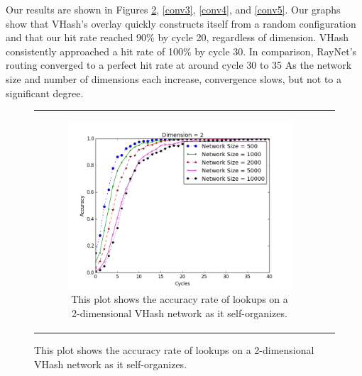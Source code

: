 \documentclass[10pt, conference, letterpaper]{IEEEtran}
\begin{document}
Our results are shown in Figures \ref{conv2}, \ref{conv3}, \ref{conv4}, and \ref{conv5}.
Our graphs show that VHash's overlay quickly constructs itself from a random configuration and that our hit rate reached 90\% by cycle 20, regardless of dimension.
VHash consistently approached a hit rate of 100\% by cycle 30. 
In comparison, RayNet's routing converged to a perfect hit rate at around cycle 30 to 35 \cite{raynet} 
As the network size and number of dimensions each increase, convergence slows, but not to a significant degree.
 
\begin{figure}
\centering 
\begin{tabular}{cc}

\begin{subfigure}{\columnwidth}
        \includegraphics[width=\columnwidth]{conv_d2}
        \caption{This plot shows the accuracy rate of lookups on a 2-dimensional VHash network as it self-organizes.}
        \label{conv2}
\end{subfigure} &


\end{tabular}
\end{figure}
\end{document}
